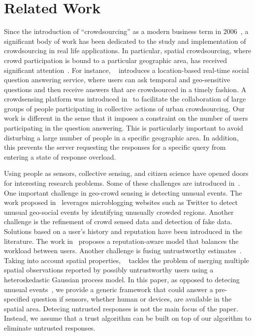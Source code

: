 \documentclass{acm_proc_article-sp}
\begin{document}
\section{Related Work}
Since the introduction of ``crowdsourcing'' as a modern business term in 2006~\cite{howe2006rise}, a significant body of work has been dedicated to the study and implementation of crowdsourcing in real life applications. In particular, spatial crowdsourcing, where crowd participation is bound to a particular geographic area, has received significant attention~\cite{kazemi2012geocrowd, deng2013maximizing, yu2015quality}. For instance, ~\cite{liu2013using} introduces a location-based real-time social question answering service, where users can ask temporal and geo-sensitive questions and then receive answers that are crowdsourced in a timely fashion. A crowdsensing platform was introduced in~\cite{cardone2013fostering} to facilitate the collaboration of large groups of people participating in collective actions of urban crowdsourcing. Our work is different in the sense that it imposes a constraint on the number of users participating in the question answering. This is particularly important to avoid disturbing a large number of people in a specific geographic area. In addition, this prevents the server requesting the responses for a specific query from entering a state of response overload.\par

Using people as sensors, collective sensing, and citizen science have opened doors for interesting research problems. Some of these challenges are introduced in~\cite{blaschke2011collective}. One important challenge in geo-crowd sensing is detecting unusual events. The work proposed in~\cite{lee2010measuring} leverages microblogging websites such as Twitter to detect unusual geo-social events by identifying unusually crowded regions. Another challenge is the refinement of crowd sensed data and detection of fake data. Solutions based on a user's history and reputation have been introduced in the literature. The work in~\cite{yu2013reputation} proposes a reputation-aware model that balances the workload between users. Another challenge is fusing untrustworthy estimates~\cite{venanzi2013trust}. Taking into account spatial properties, ~\cite{venanzi2013crowdsourcing} tackles the problem of merging multiple spatial observations reported by possibly untrustworthy users using a heteroskedastic Gaussian process model. In this paper, as opposed to detecing unusual events~\cite{blaschke2011collective}, we provide a generic framework that could answer a pre-specified question if sensors, whether human or devices, are available in the spatial area. Detecing untrusted responses is not the main focus of the paper. Instead, we assume that a trust algorithm can be built on top of our algorithm to eliminate untrusted responses.\par
\end{document}
